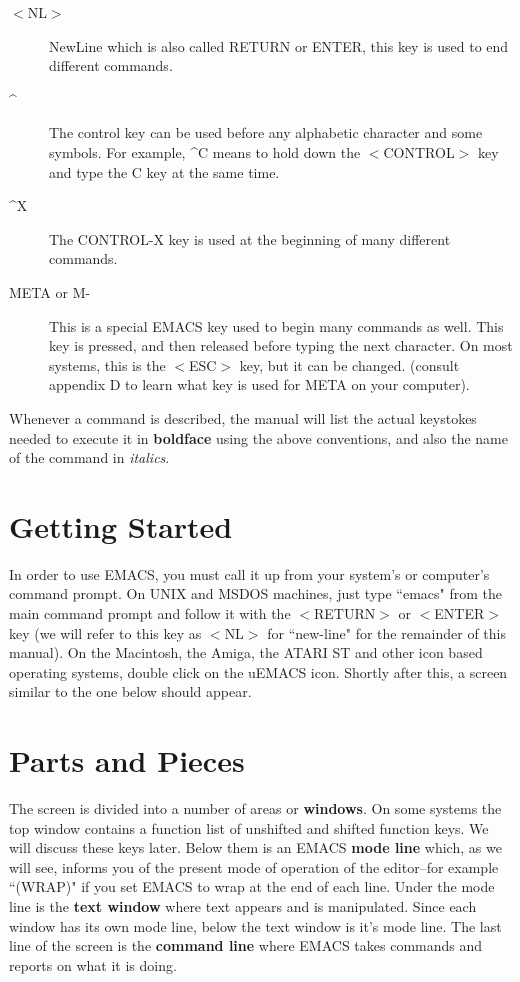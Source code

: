 \begin{description}
\item[$<${}NL$>${}] NewLine which is also called RETURN or ENTER,
this key is used to  end different commands.

\item[\^{}] The control key can be used before any alphabetic
character and some symbols.  For example, \^{}C means to hold down the
$<${}CONTROL$>${} key and type  the C key at the
same time.

\item[\^{}X] The CONTROL-X key is used at the beginning of many different
 commands.

\item[META or M-] This is a special EMACS key used to begin many
commands as  well.  This key is pressed, and then
released before typing the next character.  On most systems, this is
the $<${}ESC$>${} key, but it can be changed.  (consult appendix D to
learn what key is used for META on your computer).  \end{description}

Whenever a command is described, the manual will list the actual
keystokes needed to execute it in {\bf{}boldface} using the above
conventions, and also the name of the command in {\it{}italics}.
\section{Getting Started}

In order to use EMACS, you must call it up from your system's or
computer's command prompt.  On UNIX and MSDOS machines, just type
``emacs" from the main command prompt and follow it with the
$<${}RETURN$>${} or $<${}ENTER$>${} key (we will refer to this key as
$<${}NL$>${} for ``new-line" for the remainder of this manual).  On
the Macintosh, the Amiga, the ATARI ST and other icon based operating
systems, double click on the uEMACS icon.  Shortly after this, a
screen similar to the one below should appear.

\section{Parts and Pieces}

The screen is divided into a number of areas or {\bf{}windows}.  On
some systems the top window contains a function list of unshifted and
 shifted function keys.  We will discuss these keys later.
 Below them is an EMACS {\bf{}mode line} which, as we will
see, informs you of the present mode of operation of the editor--for
example ``(WRAP)" if you set EMACS to wrap at the end of each line.
 Under the mode line is the {\bf{}text window} where text
appears and is manipulated.  Since each window has its own mode line,
below the text window is it's mode line.  The last line of the screen is
the {\bf{}command line} where EMACS takes commands and reports on what it
is doing.

